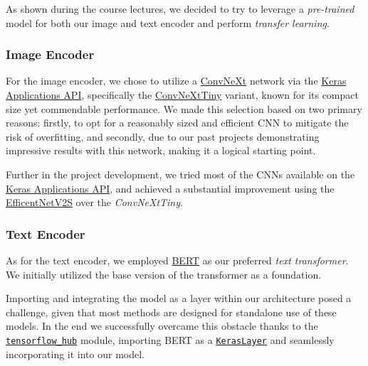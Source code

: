 \documentclass[10pt,twocolumn,letterpaper]{article}
\begin{document}
As shown during the course lectures, we decided to try to leverage a \textit{pre-trained} model for both our image and text encoder and perform \textit{transfer learning}.

\subsubsection{Image Encoder}
For the image encoder, we chose to utilize a \href{https://github.com/facebookresearch/ConvNeXt}{ConvNeXt} network via the \href{https://keras.io/api/applications/}{Keras Applications API}, specifically the \href{https://keras.io/api/applications/convnext/#convnexttiny-function}{ConvNeXtTiny} variant, known for its compact size yet commendable performance.
We made this selection based on two primary reasons: firstly, to opt for a reasonably sized and efficient CNN to mitigate the risk of overfitting, and secondly, due to our past projects demonstrating impressive results with this network, making it a logical starting point.

Further in the project development, we tried most of the CNNs available on the \href{https://keras.io/api/applications/}{Keras Applications API}, and achieved a substantial improvement using the \href{https://keras.io/api/applications/efficientnet_v2/#efficientnetv2s-function}{EfficentNetV2S} over the \textit{ConvNeXtTiny}.

\subsubsection{Text Encoder}
As for the text encoder, we employed \href{https://huggingface.co/docs/transformers/model_doc/bert}{BERT} as our preferred \textit{text transformer}.
We initially utilized the base version of the transformer as a foundation.

Importing and integrating the model as a layer within our architecture posed a challenge, given that most methods are designed for standalone use of these models.
In the end we successfully overcame this obstacle thanks to the \href{https://www.tensorflow.org/hub}{\texttt{tensorflow\_hub}} module, importing BERT as a \href{https://www.tensorflow.org/hub/api_docs/python/hub/KerasLayer}{\texttt{KerasLayer}} and seamlessly incorporating it into our model.
\end{document}
